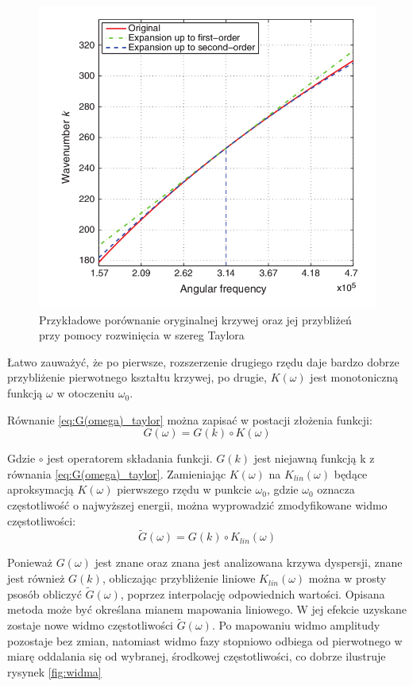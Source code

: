 \begin{figure}[h]
\centering
\includegraphics[width=14cm]{Zdjecia/4/buba}
\caption{Przykładowe porównanie oryginalnej krzywej oraz jej przybliżeń przy pomocy rozwinięcia w szereg Taylora}
\label{fig:krzywa_taylorem}
\end{figure}

Łatwo zauważyć, że po pierwsze, rozszerzenie drugiego rzędu daje bardzo dobrze przybliżenie pierwotnego kształtu krzywej, po drugie, $K(\omega)$ jest monotoniczną funkcją $\omega$ w otoczeniu $\omega _0$. 

Równanie \ref{eq:G(omega)_taylor} można zapisać w postacji złożenia funkcji:
\begin{equation}
G(\omega) = G(k)\circ K(\omega)
\end{equation}

Gdzie $\circ$ jest operatorem składania funkcji. $G(k)$ jest niejawną funkcją k z równania \ref{eq:G(omega)_taylor}. Zamieniając $K(\omega)$ na $K_{lin}(\omega)$ będące aproksymacją $K(\omega)$ pierwszego rzędu w punkcie $\omega _0$, gdzie $\omega _0$ oznacza częstotliwość o najwyższej energii, można wyprowadzić zmodyfikowane widmo częstotliwości:
\begin{equation}
\widetilde{G}(\omega) = G(k)\circ K_{lin}(\omega)
\end{equation}

Ponieważ $G(\omega)$ jest znane oraz znana jest analizowana krzywa dyspersji, znane jest również $G(k)$, obliczając przybliżenie liniowe $K_{lin}(\omega)$ można w prosty psosób obliczyć $\widetilde{G}(\omega)$, poprzez interpolację odpowiednich wartości. Opisana metoda może być określana mianem mapowania liniowego. W jej efekcie uzyskane zostaje nowe widmo częstotliwości $\widetilde{G}(\omega)$. Po mapowaniu widmo amplitudy pozostaje bez zmian, natomiast widmo fazy stopniowo odbiega od pierwotnego w miarę oddalania się od wybranej, środkowej częstotliwości, co dobrze ilustruje rysynek \ref{fig:widma}

